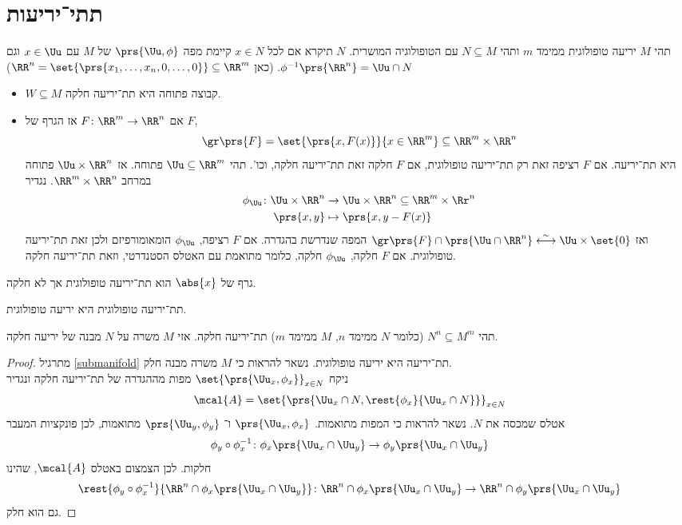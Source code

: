 \documentclass[a4paper,10pt,twoside,openany]{book}
\begin{document}
\section{תתי־יריעות}
\begin{definition}
תהי
$M$
יריעה טופולוגית
ממימד
$m$
ותהי
$N \subseteq M$
עם הטופולוגיה המושרית.
$N$
תיקרא
אם לכל
$x \in N$
קיימת מפה
$\prs{\Uu,\phi}$
של
$M$
עם
$x \in \Uu$
וגם
$\phi^{-1}\prs{\RR^n} = \Uu \cap N$.
(כאן
$\RR^n = \set{\prs{x_1, \ldots, x_n, 0, \ldots, 0}} \subseteq \RR^m$)
\end{definition}
\begin{examples}
\begin{itemize}
\item $W \subseteq M$
קבוצה פתוחה היא תת־יריעה חלקה.
\item אם
$F \colon \RR^m \to \RR^n$
אז הגרף של
$F$,
\[\gr\prs{F} = \set{\prs{x,F(x)}}{x \in \RR^m} \subseteq \RR^m \times \RR^n\]
היא תת־יריעה.
אם
$F$
רציפה זאת רק תת־יריעה טופולוגית, אם
$F$
חלקה זאת תת־יריעה חלקה, וכו'.
תהי
$\Uu \subseteq \RR^m$
פתוחה. אז
$\Uu \times \RR^n$
פתוחה במרחב
$\RR^m \times \RR^n$.
נגדיר
\begin{align*}
\phi_{\Uu} \colon \Uu \times \RR^n &\to \Uu \times \RR^n \subseteq \RR^m \times \Rr^n \\
\prs{x,y} &\mapsto \prs{x,y-F(x)}
\end{align*}
ואז
$\gr\prs{F} \cap \prs{\Uu \cap \RR^n} \stackrel{\sim}{\longleftrightarrow} \Uu \times \set{0}$
המפה שנדרשת בהגדרה.
אם
$F$
רציפה,
$\phi_{\Uu}$
הומאומורפיזם ולכן זאת תת־יריעה טופולוגית.
אם
$F$
חלקה,
$\phi_{\Uu}$
חלקה, כלומר מתואמת עם האטלס הסטנדרטי, וזאת תת־יריעה חלקה.
\end{itemize}
\end{examples}
\begin{exercise}
גרף של
$\abs{x}$
הוא תת־יריעה טופולוגית אך לא חלקה.
\end{exercise}
\begin{exercise}\label{submanifold}
תת־יריעה טופולוגית היא יריעה טופולוגית.
\end{exercise}
\begin{proposition}
תהי
$N^n \subseteq M^m$
(כלומר
$N$
ממימד
$n$,
$M$
ממימד
$m$)
תת־יריעה חלקה. אזי
$M$
משרה על
$N$
מבנה של יריעה חלקה.
\end{proposition}
\begin{proof}
מתרגיל
\ref{submanifold}
תת־יריעה היא יריעה טופולוגית. נשאר להראות כי
$M$
משרה מבנה חלק.\\
ניקח
$\set{\prs{\Uu_x,\phi_x}}_{x \in N}$
מפות מההגדרה של תת־יריעה חלקה ונגדיר
\[\mcal{A} = \set{\prs{\Uu_x \cap N, \rest{\phi_x}{\Uu_x \cap N}}}_{x \in N}\]
אטלס שמכסה את
$N$.
נשאר להראות כי המפות מתואמות.
$\prs{\Uu_x, \phi_x}$
ו־%
$\prs{\Uu_y, \phi_y}$
מתואמות, לכן פונקציות המעבר
\[\phi_y \circ \phi_x^{-1} \colon \phi_x\prs{\Uu_x \cap \Uu_y} \to \phi_y\prs{\Uu_x \cap \Uu_y}\]
חלקות.
לכן הצמצום באטלס
$\mcal{A}$,
שהינו
\[\rest{\phi_y \circ \phi_x^{-1}}{\RR^n \cap \phi_x\prs{\Uu_x \cap \Uu_y}} \colon \RR^n \cap \phi_x\prs{\Uu_x \cap \Uu_y} \to \RR^n \cap \phi_y\prs{\Uu_x \cap \Uu_y}\]
גם הוא חלק.
\end{proof}
\end{document}
